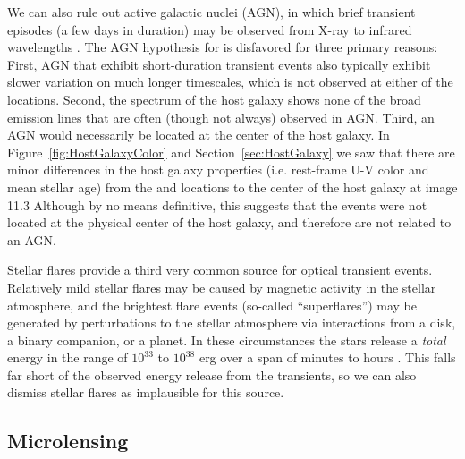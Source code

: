 We can also rule out active galactic nuclei (AGN), in which brief
transient episodes (a few days in duration) may be observed from X-ray
to infrared wavelengths \citep[e.g.][]{Gaskell:2003}.  The AGN
hypothesis for \spock is disfavored for three primary reasons:
First, AGN that exhibit short-duration transient events also typically
exhibit slower variation on much longer timescales, which is not
observed at either of the \spock locations. Second, the spectrum
of the \spock host galaxy shows none of the broad emission lines that
are often (though not always) observed in AGN.  Third, an AGN would
necessarily be located at the center of the host galaxy.
In Figure~\ref{fig:HostGalaxyColor} and Section~\ref{sec:HostGalaxy}
we saw that there are minor differences in the host galaxy properties
(i.e. rest-frame U-V color and mean stellar age) from the \spockone
and \spocktwo locations to the center of the host galaxy at image 11.3
Although by no means definitive, this suggests that the \spock events
were not located at the physical center of the host galaxy, and
therefore are not related to an AGN.

Stellar flares provide a third very common source for optical
transient events. Relatively mild stellar flares may be caused by
magnetic activity in the stellar atmosphere, and the brightest flare
events (so-called ``superflares'') may be generated by perturbations
to the stellar atmosphere via interactions from a disk, a binary
companion, or a planet.  In these circumstances the stars release a
{\em total} energy in the range of $10^{33}$ to $10^{38}$ erg over a
span of minutes to hours \citep{Balona:2012,Karoff:2016}. This falls
far short of the observed energy release from the \spock transients,
so we can also dismiss stellar flares as implausible for this source.

\subsection{Microlensing}

